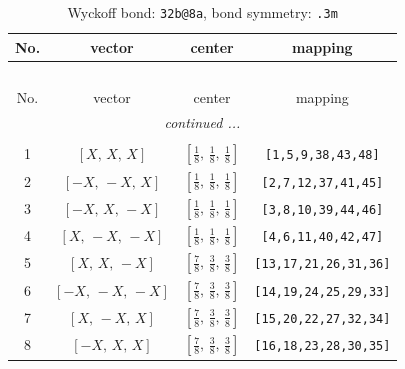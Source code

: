 \documentclass[fleqn,8pt]{jsarticle}
\begin{document}
\renewcommand{\arraystretch}{1.2}
\begin{longtable}{cccc}
\caption{Wyckoff bond: {\tt 32b@8a}, bond symmetry: {\tt .3m}}
 \\
 \hline \hline
No. & vector & center & mapping \\ \hline \endfirsthead

\multicolumn{3}{l}{\tablename\ \thetable{}} \\
 \hline \hline
No. & vector & center & mapping \\ \hline \endhead

 \hline \hline
\multicolumn{3}{r}{\footnotesize\it continued ...} \\ \endfoot

 \hline \hline
\multicolumn{3}{r}{} \\ \endlastfoot

1 & $\left[ X,\, X,\, X \right]$ & $\left[ \frac{1}{8},\, \frac{1}{8},\, \frac{1}{8} \right]$ & {\tt [1,5,9,38,43,48]} \\ \hline
2 & $\left[ - X,\, - X,\, X \right]$ & $\left[ \frac{1}{8},\, \frac{1}{8},\, \frac{1}{8} \right]$ & {\tt [2,7,12,37,41,45]} \\ \hline
3 & $\left[ - X,\, X,\, - X \right]$ & $\left[ \frac{1}{8},\, \frac{1}{8},\, \frac{1}{8} \right]$ & {\tt [3,8,10,39,44,46]} \\ \hline
4 & $\left[ X,\, - X,\, - X \right]$ & $\left[ \frac{1}{8},\, \frac{1}{8},\, \frac{1}{8} \right]$ & {\tt [4,6,11,40,42,47]} \\ \hline
5 & $\left[ X,\, X,\, - X \right]$ & $\left[ \frac{7}{8},\, \frac{3}{8},\, \frac{3}{8} \right]$ & {\tt [13,17,21,26,31,36]} \\ \hline
6 & $\left[ - X,\, - X,\, - X \right]$ & $\left[ \frac{7}{8},\, \frac{3}{8},\, \frac{3}{8} \right]$ & {\tt [14,19,24,25,29,33]} \\ \hline
7 & $\left[ X,\, - X,\, X \right]$ & $\left[ \frac{7}{8},\, \frac{3}{8},\, \frac{3}{8} \right]$ & {\tt [15,20,22,27,32,34]} \\ \hline
8 & $\left[ - X,\, X,\, X \right]$ & $\left[ \frac{7}{8},\, \frac{3}{8},\, \frac{3}{8} \right]$ & {\tt [16,18,23,28,30,35]} \\
\end{longtable}
\renewcommand{\arraystretch}{1.2}
\end{document}
